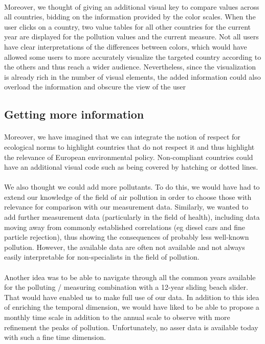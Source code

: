 \documentclass[preprint,journal]{vgtc}       %
\begin{document}
\paragraph{}
Moreover, we thought of giving an additional visual key to compare values ​​across all countries, bidding on the information provided by the color scales. When the user clicks on a country, two value tables for all other countries for the current year are displayed for the pollution values ​​and the current measure. Not all users have clear interpretations of the differences between colors, which would have allowed some users to more accurately visualize the targeted country according to the others and thus reach a wider audience. Nevertheless, since the visualization is already rich in the number of visual elements, the added information could also overload the information and obscure the view of the user


\subsection{Getting more information}

\paragraph{}
Moreover, we have imagined that we can integrate the notion of respect for ecological norms to highlight countries that do not respect it and thus highlight the relevance of European environmental policy. Non-compliant countries could have an additional visual code such as being covered by hatching or dotted lines.

\paragraph{}
We also thought we could add more pollutants. To do this, we would have had to extend our knowledge of the field of air pollution in order to choose those with relevance for comparison with our measurement data. Similarly, we wanted to add further measurement data (particularly in the field of health), including data moving away from commonly established correlations (eg diesel cars and fine particle rejection), thus showing the consequences of probably less well-known pollution. However, the available data are often not available and not always easily interpretable for non-specialists in the field of pollution.
		
\paragraph{}		
Another idea was to be able to navigate through all the common years available for the polluting / measuring combination with a 12-year sliding beach slider. That would have enabled us to make full use of our data. In addition to this idea of ​​enriching the temporal dimension, we would have liked to be able to propose a monthly time scale in addition to the annual scale to observe with more refinement the peaks of pollution. Unfortunately, no asser data is available today with such a fine time dimension.
\end{document}
